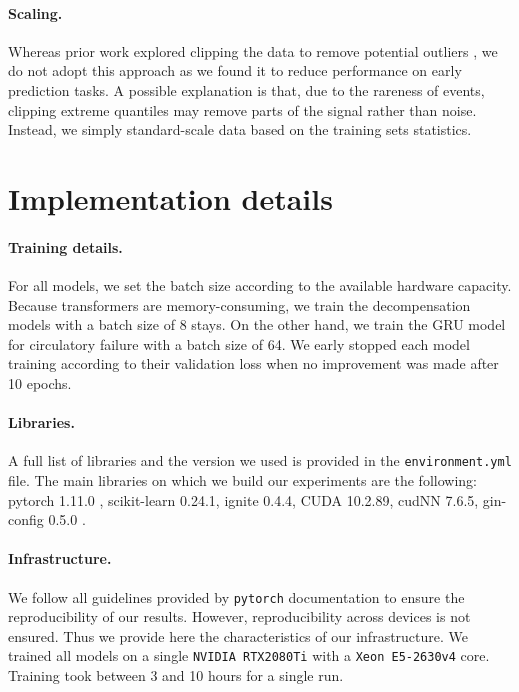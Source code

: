 \documentclass[nohyperref]{article}
\begin{document}
\paragraph{Scaling.} Whereas prior work explored clipping the data to remove potential outliers \citep{tomavsev2019}, we do not adopt this approach as we found it to reduce performance on early prediction tasks. A possible explanation is that, due to the rareness of events, clipping extreme quantiles may remove parts of the signal rather than noise. Instead, we simply standard-scale data based on the training sets statistics. 


\section{Implementation details}
\label{appendix:implementation_details}

\paragraph{Training details.} For all models, we set the batch size according to the available hardware capacity. Because transformers are memory-consuming, we train the {decompensation} models with a batch size of 8 stays. On the other hand, we train the GRU model for {circulatory failure} with a batch size of 64. We early stopped each model training according to their validation loss when no improvement was made after 10 epochs. 

\paragraph{Libraries.} A full list of libraries and the version we used is provided in the \texttt{environment.yml} file. The main libraries on which we build our experiments are the following: pytorch 1.11.0 \citep{NEURIPS2019_9015}, scikit-learn 0.24.1\citep{scikit-learn}, ignite 0.4.4, CUDA 10.2.89\citep{cuda}, cudNN 7.6.5\citep{chetlur2014cudnn}, gin-config 0.5.0 \citep{gin}.

\paragraph{Infrastructure.}
We follow all guidelines provided by \texttt{pytorch} documentation to ensure the reproducibility of our results. However, reproducibility across devices is not ensured. Thus we provide here the characteristics of our infrastructure. We trained all models on a single \texttt{NVIDIA RTX2080Ti} with a \texttt{Xeon E5-2630v4} core. Training took between 3 and 10 hours for a single run.
\end{document}
